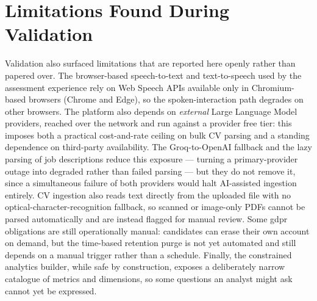 
\section{Limitations Found During Validation}
\label{sec:val-limitations}

Validation also surfaced limitations that are reported here openly rather
than papered over. The browser-based speech-to-text and text-to-speech used by the
assessment experience rely on Web Speech APIs available only in
Chromium-based browsers (Chrome and Edge), so the spoken-interaction path
degrades on other browsers. The platform also depends on \emph{external}
Large Language Model providers, reached over the network and run against a
provider free tier: this imposes both a practical cost-and-rate ceiling on
bulk CV parsing and a standing dependence on third-party availability. The
Groq-to-OpenAI fallback and the lazy parsing of job descriptions reduce this
exposure --- turning a primary-provider outage into degraded rather than
failed parsing --- but they do not remove it, since a simultaneous failure of
both providers would halt AI-assisted ingestion entirely. CV ingestion also reads text
directly from the uploaded file with no optical-character-recognition
fallback, so scanned or image-only PDFs cannot be parsed automatically and are
instead flagged for manual review. Some \gls{gdpr} obligations are
still operationally manual: candidates can erase their own account on demand,
but the time-based retention purge is not yet automated and still depends on
a manual trigger rather than a schedule. Finally, the constrained analytics builder, while safe by
construction, exposes a deliberately narrow catalogue of metrics and
dimensions, so some questions an analyst might ask cannot yet be expressed.

